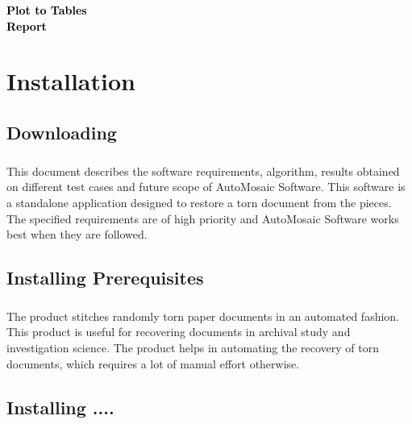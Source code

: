 \documentclass[12pts]{scrreprt}
\date{}
\begin{document}
 

\begin{titlepage}
    \vspace*{\fill}
    \begin{center}
      \textcolor{black}{{\Huge {\textbf{Plot to Tables}}}}\\[0.5cm]
      \textcolor{black}{{\Huge {\textbf{Report}}}}\\[0.5cm]
    \end{center}
    \vspace*{\fill}
\end{titlepage}


\tableofcontents 

\chapter{Installation } 

\section{Downloading}

\paragraph{}
This document describes the software requirements, algorithm, results obtained on different test cases and future scope of AutoMosaic Software. This software is a standalone application designed to restore a torn document from the pieces. The specified requirements are of high priority and AutoMosaic Software works best when they are followed.

\section{Installing Prerequisites} 
\paragraph{}
The product stitches randomly torn paper documents in an automated fashion. This product is useful for recovering documents in archival study and investigation science. The product helps in automating the recovery of torn documents, which requires a lot of manual effort otherwise.

\section{Installing ....} 
\end{document}

